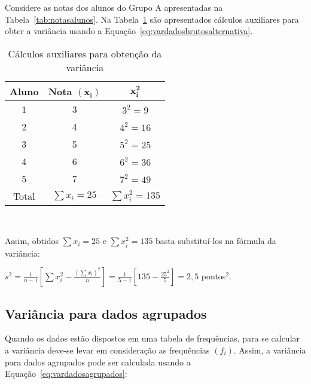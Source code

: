 \documentclass[11pt,fleqn]{book} %
\begin{document}
\begin{example}

Considere as notas dos alunos do Grupo A apresentadas na Tabela~\ref{tab:notasalunos}. Na Tabela~\ref{tab:vardadosbrutosalternativa} são apresentados cálculos auxiliares para obter a variância usando a Equação~\ref{eq:vardadosbrutosalternativa}.\\

\begin{table}[h]
	\caption{Cálculos auxiliares para obtenção da variância}
	\label{tab:vardadosbrutosalternativa} 
	\vspace{-0.1cm}
	\centering
	\begin{tabular}{c c c}
	\toprule
	\textbf{Aluno} & \textbf{Nota $\bm{(x_i)}$} & $\bm{x_i^2}$ \\
	\midrule
	1 & 3 & $3^2=9$ \\
	2 & 4 & $4^2=16$ \\
	3 & 5 & $5^2=25$ \\
	4 & 6 & $6^2=36$ \\
	5 & 7 & $7^2=49$ \\
	\hline
	Total & $\sum x_i=25$ & $\sum x_i^2=135$ \\
	\bottomrule
	\end{tabular} \\
\end{table}

Assim, obtidos $\sum x_i=25$ e $\sum x_i^2=135$ basta substituí-los na fórmula da variância:

\begin{center}
$\displaystyle s^2=\frac{1}{n-1}\left[\sum{x_i^2}-\frac{(\sum x_i)^2}{n}\right]
= \frac{1}{5-1}\left[135-\frac{25^2}{5}\right] = 2,5$ pontos$^2$.
\end{center}

\end{example}





\subsection{Variância para dados agrupados}

Quando os dados estão dispostos em uma tabela de frequências, para se calcular a variância deve-se levar em consideração as frequências $(f_i)$. Assim, a variância para dados agrupados pode ser calculada usando a Equação~\ref{eq:vardadosagrupados}: \\
\end{document}
